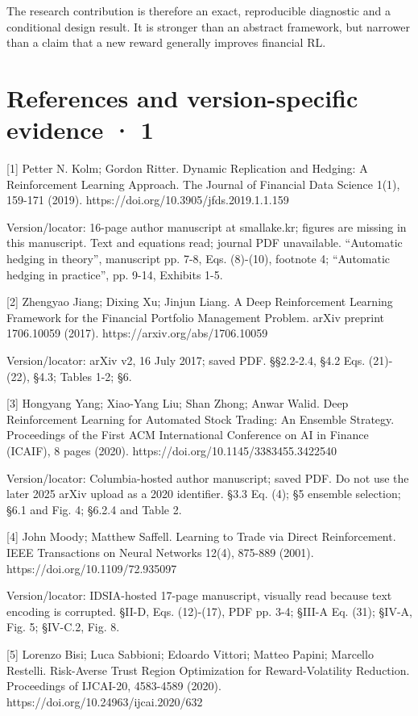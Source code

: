 \documentclass[10pt,a4paper]{article}
\begin{document}
The research contribution is therefore an exact, reproducible diagnostic and a conditional design result. It is stronger than an abstract framework, but narrower than a claim that a new reward generally improves financial RL.

\clearpage
\section*{References and version-specific evidence · 1}
[1] Petter N. Kolm; Gordon Ritter. Dynamic Replication and Hedging: A Reinforcement Learning Approach. The Journal of Financial Data Science 1(1), 159-171 (2019). https://doi.org/10.3905/jfds.2019.1.1.159

Version/locator: 16-page author manuscript at smallake.kr; figures are missing in this manuscript. Text and equations read; journal PDF unavailable. “Automatic hedging in theory”, manuscript pp. 7-8, Eqs. (8)-(10), footnote 4; “Automatic hedging in practice”, pp. 9-14, Exhibits 1-5.

[2] Zhengyao Jiang; Dixing Xu; Jinjun Liang. A Deep Reinforcement Learning Framework for the Financial Portfolio Management Problem. arXiv preprint 1706.10059 (2017). https://arxiv.org/abs/1706.10059

Version/locator: arXiv v2, 16 July 2017; saved PDF. §§2.2-2.4, §4.2 Eqs. (21)-(22), §4.3; Tables 1-2; §6.

[3] Hongyang Yang; Xiao-Yang Liu; Shan Zhong; Anwar Walid. Deep Reinforcement Learning for Automated Stock Trading: An Ensemble Strategy. Proceedings of the First ACM International Conference on AI in Finance (ICAIF), 8 pages (2020). https://doi.org/10.1145/3383455.3422540

Version/locator: Columbia-hosted author manuscript; saved PDF. Do not use the later 2025 arXiv upload as a 2020 identifier. §3.3 Eq. (4); §5 ensemble selection; §6.1 and Fig. 4; §6.2.4 and Table 2.

[4] John Moody; Matthew Saffell. Learning to Trade via Direct Reinforcement. IEEE Transactions on Neural Networks 12(4), 875-889 (2001). https://doi.org/10.1109/72.935097

Version/locator: IDSIA-hosted 17-page manuscript, visually read because text encoding is corrupted. §II-D, Eqs. (12)-(17), PDF pp. 3-4; §III-A Eq. (31); §IV-A, Fig. 5; §IV-C.2, Fig. 8.

[5] Lorenzo Bisi; Luca Sabbioni; Edoardo Vittori; Matteo Papini; Marcello Restelli. Risk-Averse Trust Region Optimization for Reward-Volatility Reduction. Proceedings of IJCAI-20, 4583-4589 (2020). https://doi.org/10.24963/ijcai.2020/632
\end{document}
